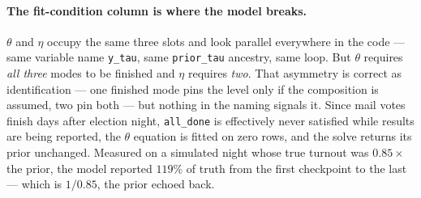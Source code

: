 \documentclass[11pt]{article}
\newcommand{\var}[1]{\texttt{\footnotesize #1}}
\begin{document}
\paragraph{The fit-condition column is where the model breaks.}
$\theta$ and $\eta$ occupy the same three slots and look parallel everywhere in the code
--- same variable name \var{y\_tau}, same \var{prior\_tau} ancestry, same loop. But
$\theta$ requires \emph{all three} modes to be finished and $\eta$ requires \emph{two}.
That asymmetry is correct as identification --- one finished mode pins the level only if
the composition is assumed, two pin both --- but nothing in the naming signals it. Since
mail votes finish days after election night, \var{all\_done} is effectively never
satisfied while results are being reported, the $\theta$ equation is fitted on zero rows,
and the solve returns its prior unchanged. Measured on a simulated night whose true
turnout was $0.85 \times$ the prior, the model reported $119\%$ of truth from the first
checkpoint to the last --- which is $1/0.85$, the prior echoed back.
\end{document}
